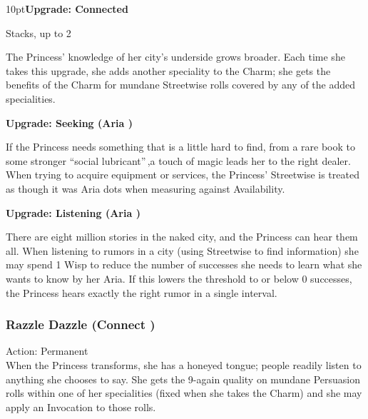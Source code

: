 \begin{myindentpar}{10pt}\textbf{Upgrade: Connected}

Stacks, up to 2

The Princess' knowledge of her city's underside grows broader. Each time she takes this upgrade, she adds another speciality to the Charm; she gets the benefits of the Charm for mundane Streetwise rolls covered by any of the added specialities.

\textbf{Upgrade: Seeking (Aria \textbullet\textbullet)}

If the Princess needs something that is a little hard to find, from a rare book to some stronger \textquotedblleft social lubricant\textquotedblright\,,a touch of magic leads her to the right dealer. When trying to acquire equipment or services, the Princess' Streetwise is treated as though it was Aria dots when measuring against Availability. 

\textbf{Upgrade: Listening (Aria \textbullet\textbullet)}

There are eight million stories in the naked city, and the Princess can hear them all. When listening to rumors in a city (using Streetwise to find information) she may spend 1 Wisp to reduce the number of successes she needs to learn what she wants to know by her Aria. If this lowers the threshold to or below 0 successes, the Princess hears exactly the right rumor in a single interval.\end{myindentpar}

\subsubsection*{Razzle Dazzle (Connect \textbullet)}

\noindent Action: Permanent \\

\noindent When the Princess transforms, she has a honeyed tongue; people readily listen to anything she chooses to say. She gets the 9-again quality on mundane Persuasion rolls within one of her specialities (fixed when she takes the Charm) and she may apply an Invocation to those rolls.

